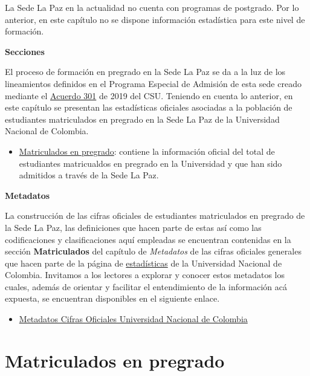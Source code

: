 \documentclass[
]{book}
\providecommand{\tightlist}{%
  \setlength{\itemsep}{0pt}\setlength{\parskip}{0pt}}
\begin{document}
La Sede La Paz en la actualidad no cuenta con programas de postgrado. Por lo anterior, en este capítulo no se dispone información estadística para este nivel de formación.

\textbf{Secciones}

El proceso de formación en pregrado en la Sede La Paz se da a la luz de los lineamientos definidos en el Programa Especial de Admisión de esta sede creado mediante el \href{http://www.legal.unal.edu.co/rlunal/home/doc.jsp?d_i=93599}{Acuerdo 301} de 2019 del CSU. Teniendo en cuenta lo anterior, en este capítulo se presentan las estadísticas oficiales asociadas a la población de estudiantes matriculados en pregrado en la Sede La Paz de la Universidad Nacional de Colombia.

\begin{itemize}
\tightlist
\item
  \protect\hyperlink{MatPre}{Matriculados en pregrado}: contiene la información oficial del total de estudiantes matricualdos en pregrado en la Universidad y que han sido admitidos a través de la Sede La Paz.
\end{itemize}

\textbf{Metadatos}

La construcción de las cifras oficiales de estudiantes matriculados en pregrado de la Sede La Paz, las definiciones que hacen parte de estas así como las codificaciones y clasificaciones aquí empleadas se encuentran contenidas en la sección \textbf{Matriculados} del capítulo de \emph{Metadatos} de las cifras oficiales generales que hacen parte de la página de \href{http://estadisticas.unal.edu.co/home/}{estadísticas} de la Universidad Nacional de Colombia. Invitamos a los lectores a explorar y conocer estos metadatos los cuales, además de orientar y facilitar el entendimiento de la información acá expuesta, se encuentran disponibles en el siguiente enlace.

\begin{itemize}
\tightlist
\item
  \href{http://estadisticas.unal.edu.co/menu-principal/cifras-generales/metadatos/cifras-generales/}{Metadatos Cifras Oficiales Universidad Nacional de Colombia}
\end{itemize}

\hypertarget{MatPre}{%
\section{Matriculados en pregrado}\label{MatPre}}
\end{document}
